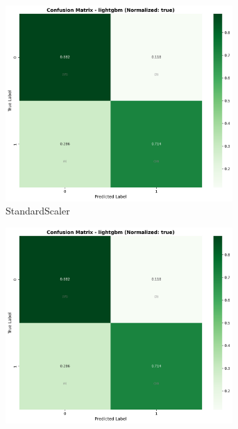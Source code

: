 \begin{figure}[H]
\centering
\begin{subfigure}[b]{0.31\textwidth}
\centering
\includegraphics[width=0.95\textwidth]{Result/cleveland_dataset/confusion_matrices/lightgbm_numeric_dataset_StandardScaler.png}
\caption{StandardScaler}
\label{fig:lgbm_clev_cm_standard}
\end{subfigure}\hfill
\begin{subfigure}[b]{0.31\textwidth}
\centering
\includegraphics[width=0.95\textwidth]{Result/cleveland_dataset/confusion_matrices/lightgbm_numeric_dataset_MinMaxScaler.png}

\end{subfigure}
\end{figure}
